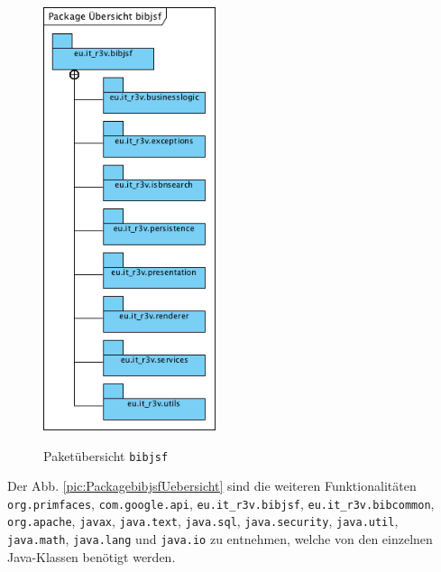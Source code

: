 \documentclass[fontsize=12pt,paper=a4,twoside]{scrartcl}
\begin{document}
\begin{figure} [H] 
\caption{Paketübersicht \texttt{bibjsf}} \centering
 \includegraphics[width=0.45\textwidth]{Diagramme/Packagebibjsfuebersicht.png} 
 \label{pic:Packagebibjsf} 
\end{figure}

Der Abb. \vref{pic:PackagebibjsfUebersicht} sind die weiteren Funktionalitäten \texttt{org.primfaces}, \texttt{com.google.api}, \texttt{eu.it\_r3v.bibjsf}, \texttt{eu.it\_r3v.bibcommon}, \texttt{org.apache}, \texttt{javax}, \texttt{java.text}, \texttt{java.sql}, \texttt{java.security}, \texttt{java.util}, \texttt{java.math}, \texttt{java.lang} und \texttt{java.io} zu entnehmen, welche von den einzelnen Java-Klassen benötigt werden.
\end{document}
